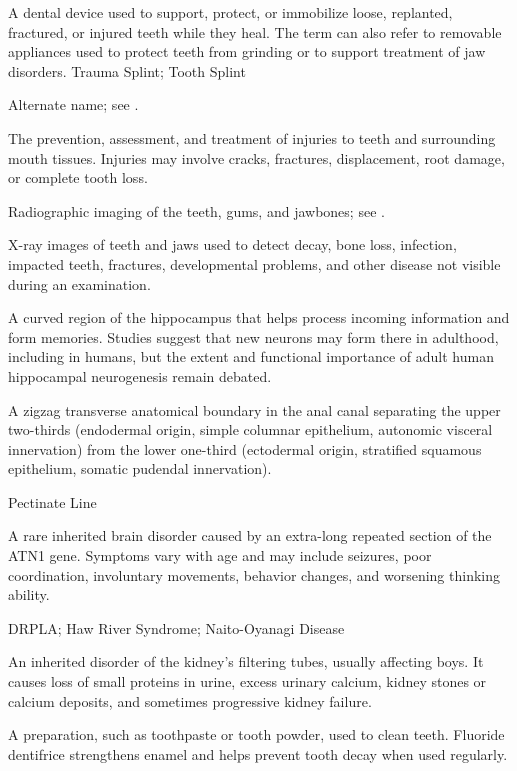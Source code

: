  A dental device used to support, protect, or immobilize loose, replanted, fractured, or injured teeth while they heal. The term can also refer to removable appliances used to protect teeth from grinding or to support treatment of jaw disorders.
\synonyms
Trauma Splint; Tooth Splint

 Alternate name; see .

 The prevention, assessment, and treatment of injuries to teeth and surrounding mouth tissues. Injuries may involve cracks, fractures, displacement, root damage, or complete tooth loss.

 Radiographic imaging of the teeth, gums, and jawbones; see .

 X-ray images of teeth and jaws used to detect decay, bone loss, infection, impacted teeth, fractures, developmental problems, and other disease not visible during an examination.

 A curved region of the hippocampus that helps process incoming information and form memories.
Studies suggest that new neurons may form there in adulthood, including in humans,
but the extent and functional importance of adult human hippocampal neurogenesis remain debated.

 A zigzag transverse anatomical boundary in the anal canal separating the upper two-thirds (endodermal origin, simple columnar epithelium, autonomic visceral innervation) from the lower one-third (ectodermal origin, stratified squamous epithelium, somatic pudendal innervation).

\synonyms
Pectinate Line

 A rare inherited brain disorder caused by an extra-long repeated section of the ATN1 gene. Symptoms vary with age and may include seizures, poor coordination, involuntary movements, behavior changes, and worsening thinking ability.

\synonyms
DRPLA; Haw River Syndrome; Naito-Oyanagi Disease

 An inherited disorder of the kidney’s filtering tubes, usually affecting boys. It causes loss of small proteins in urine, excess urinary calcium, kidney stones or calcium deposits, and sometimes progressive kidney failure.

 A preparation, such as toothpaste or tooth powder, used to clean teeth. Fluoride dentifrice strengthens enamel and helps prevent tooth decay when used regularly.

